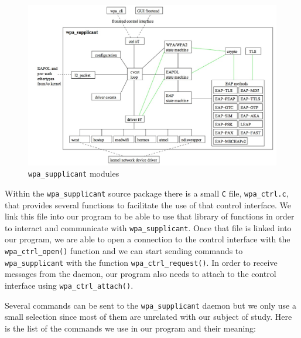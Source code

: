  \begin{figure}[H]
 	\begin{center}
		\includegraphics[width=1\linewidth]{Pictures/chapter4/wpa-supplicant-modules.jpg}
		\caption{\texttt{wpa\_supplicant} modules}
	\end{center}
\end{figure}

Within the \texttt{wpa\_supplicant} source package there is a small \texttt{C} file, \texttt{wpa\_ctrl.c}, that provides several functions to facilitate the use of that control interface. We link this file into our program to be able to use that library of functions in order to interact and communicate with \texttt{wpa\_supplicant}. Once that file is linked into our program, we are able to open a connection to the control interface with the \texttt{wpa\_ctrl\_open()} function and we can start sending commands to \texttt{wpa\_supplicant} with the function \texttt{wpa\_ctrl\_request()}. In order to receive messages from the daemon, our program also needs to attach to the control interface using \texttt{wpa\_ctrl\_attach()}.

Several commands can be sent to the \texttt{wpa\_supplicant} daemon but we only use a small selection since most of them are unrelated with our subject of study. Here is the list of the commands we use in our program and their meaning:


